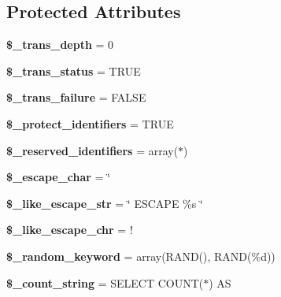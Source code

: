\subsection*{Protected Attributes}
\begin{DoxyCompactItemize}
\item 
\mbox{\label{class_c_i___d_b__driver_a3c1e4a1d64c88f0980a4017c99faf0ff}} 
{\bfseries \$\+\_\+trans\+\_\+depth} = 0
\item 
\mbox{\label{class_c_i___d_b__driver_ad40fd1453fbfd41fcf1301352893b0da}} 
{\bfseries \$\+\_\+trans\+\_\+status} = T\+R\+UE
\item 
\mbox{\label{class_c_i___d_b__driver_a54e9ad8cd120ac89ed5ca134feb55bf8}} 
{\bfseries \$\+\_\+trans\+\_\+failure} = F\+A\+L\+SE
\item 
\mbox{\label{class_c_i___d_b__driver_a61f3dcb7386c8bfbe3b26d91eea86d28}} 
{\bfseries \$\+\_\+protect\+\_\+identifiers} = T\+R\+UE
\item 
\mbox{\label{class_c_i___d_b__driver_a78d4de0164f857cece191fe60f91e751}} 
{\bfseries \$\+\_\+reserved\+\_\+identifiers} = array(\textquotesingle{}$\ast$\textquotesingle{})
\item 
\mbox{\label{class_c_i___d_b__driver_a0d0a394dd84401cdb163d47b60d27ac6}} 
{\bfseries \$\+\_\+escape\+\_\+char} = \textquotesingle{}\char`\"{}\textquotesingle{}
\item 
\mbox{\label{class_c_i___d_b__driver_a2043173f35dbef80577ac75515eeda36}} 
{\bfseries \$\+\_\+like\+\_\+escape\+\_\+str} = \char`\"{} E\+S\+C\+A\+PE \textquotesingle{}\%s\textquotesingle{} \char`\"{}
\item 
\mbox{\label{class_c_i___d_b__driver_a6dc26157644e648ab1cba60486f5b61e}} 
{\bfseries \$\+\_\+like\+\_\+escape\+\_\+chr} = \textquotesingle{}!\textquotesingle{}
\item 
\mbox{\label{class_c_i___d_b__driver_a2a63cca2d2eb0b630f35f6eaba01b9e8}} 
{\bfseries \$\+\_\+random\+\_\+keyword} = array(\textquotesingle{}R\+A\+ND()\textquotesingle{}, \textquotesingle{}R\+A\+ND(\%d)\textquotesingle{})
\item 
\mbox{\label{class_c_i___d_b__driver_a131044e858783e74464e3679724e6618}} 
{\bfseries \$\+\_\+count\+\_\+string} = \textquotesingle{}S\+E\+L\+E\+CT C\+O\+U\+NT($\ast$) AS \textquotesingle{}
\end{DoxyCompactItemize}


